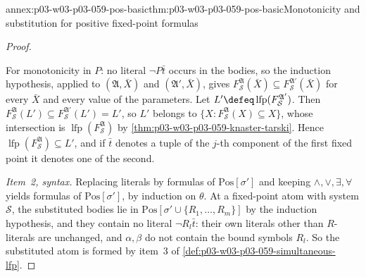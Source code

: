 \begin{annexitem}{annex:p03-w03-p03-059-pos-basic}{thm:p03-w03-p03-059-pos-basic}{Monotonicity and substitution for positive fixed-point formulas}
\begin{proof}
\begin{itemize}
       For monotonicity in \(P\): no literal \(\neg P\bar t\) occurs in the
       bodies, so the induction hypothesis, applied to
       \((\mathfrak A,\bar X)\) and \((\mathfrak A',\bar X)\), gives
       \(F^{\mathfrak A}_{\mathcal S}(\bar X)\subseteq
       F^{\mathfrak A'}_{\mathcal S}(\bar X)\) for every \(\bar X\) and
       every value of the parameters. Let
       \(L'\defeq\operatorname{lfp}(F^{\mathfrak A'}_{\mathcal S})\). Then
       \(F^{\mathfrak A}_{\mathcal S}(L')\subseteq
       F^{\mathfrak A'}_{\mathcal S}(L')=L'\), so \(L'\) belongs to
       \(\{X:F^{\mathfrak A}_{\mathcal S}(X)\subseteq X\}\), whose
       intersection is \(\operatorname{lfp}(F^{\mathfrak A}_{\mathcal S})\)
       by \cref{thm:p03-w03-p03-059-knaster-tarski}. Hence
       \(\operatorname{lfp}(F^{\mathfrak A}_{\mathcal S})\subseteq L'\), and
       if \(\bar t\) denotes a tuple of the \(j\)-th component of the first
       fixed point it denotes one of the second.
\end{itemize}

\emph{Item~2, syntax.} Replacing literals by formulas of
\(\mathrm{Pos}[\sigma']\) and keeping \(\land,\lor,\exists,\forall\)
yields formulas of \(\mathrm{Pos}[\sigma']\), by induction on \(\theta\). At
a fixed-point atom with system \(\mathcal S\), the substituted bodies lie in
\(\mathrm{Pos}[\sigma'\cup\{R_1,\ldots,R_m\}]\) by the induction
hypothesis, and they contain no literal \(\neg R_l\bar t\): their own
literals other than \(R\)-literals are unchanged, and \(\alpha,\beta\) do
not contain the bound symbols \(R_l\). So the substituted atom is formed by
item~3 of \cref{def:p03-w03-p03-059-simultaneous-lfp}.


\end{proof}
\end{annexitem}
